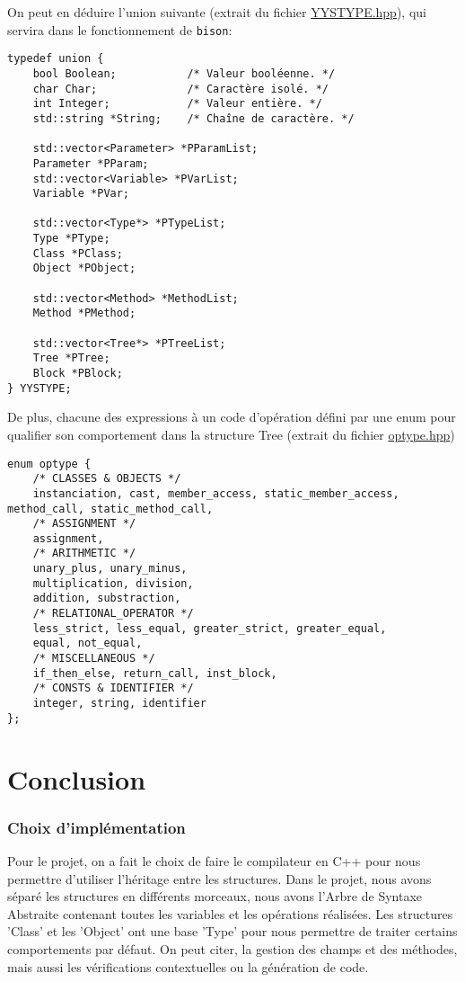 \documentclass[12pt,a4paper]{article}
\begin{document}
On peut en déduire l'{\color{blue}union} suivante (extrait du fichier \href{../YYSTYPE.hpp}{\ttfamily YYSTYPE.hpp}), qui servira dans le fonctionnement de \texttt{bison}:
\begin{lstlisting}
typedef union {
	bool Boolean;			/* Valeur booléenne. */
	char Char;				/* Caractère isolé. */
	int Integer;			/* Valeur entière. */
	std::string *String;	/* Chaîne de caractère. */
	
	std::vector<Parameter> *PParamList;
	Parameter *PParam;
	std::vector<Variable> *PVarList;
	Variable *PVar;
	
	std::vector<Type*> *PTypeList;
	Type *PType;
	Class *PClass;
	Object *PObject;
	
	std::vector<Method> *MethodList;
	Method *PMethod;
	
	std::vector<Tree*> *PTreeList;
	Tree *PTree;
	Block *PBlock;
} YYSTYPE;
\end{lstlisting}

\newpage

De plus, chacune des expressions à un code d'opération défini par une {\color{blue}enum} pour qualifier son comportement dans la structure Tree (extrait du fichier \href{../optype.hpp}{\ttfamily optype.hpp})
\begin{lstlisting}
enum optype {
	/* CLASSES & OBJECTS */
	instanciation, cast, member_access, static_member_access, method_call, static_method_call,
	/* ASSIGNMENT */
	assignment,
	/* ARITHMETIC */
	unary_plus, unary_minus,
	multiplication, division,
	addition, substraction,
	/* RELATIONAL_OPERATOR */
	less_strict, less_equal, greater_strict, greater_equal,
	equal, not_equal,
	/* MISCELLANEOUS */
	if_then_else, return_call, inst_block,
	/* CONSTS & IDENTIFIER */
	integer, string, identifier
};
\end{lstlisting}

\part{Conclusion}

\section{Choix d'implémentation}

Pour le projet, on a fait le choix de faire le compilateur en C++ pour nous permettre d’utiliser l’héritage entre les structures. Dans le projet, nous avons séparé les structures en différents morceaux, nous avons l’Arbre de Syntaxe Abstraite contenant toutes les variables et les opérations réalisées. Les structures 'Class' et les 'Object' ont une base 'Type' pour nous permettre de traiter certains comportements par défaut. On peut citer, la gestion des champs et des méthodes, mais aussi les vérifications contextuelles ou la génération de code.
\end{document}
